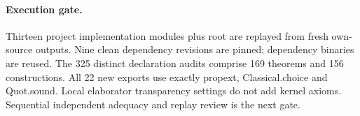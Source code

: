 \documentclass{article}
\begin{document}
\paragraph{Execution gate.} Thirteen project implementation modules plus root are replayed from fresh own-source outputs. Nine clean dependency revisions are pinned; dependency binaries are reused. The 325 distinct declaration audits comprise 169 theorems and 156 constructions. All 22 new exports use exactly propext, Classical.choice and Quot.sound. Local elaborator transparency settings do not add kernel axioms. Sequential independent adequacy and replay review is the next gate.
\end{document}

